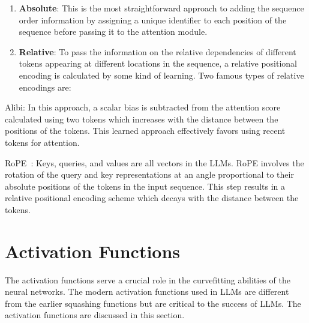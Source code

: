 \documentclass[a4paper,oneside]{book}
\begin{document}
\begin{enumerate}
  \item \textbf{Absolute}: This is the most straightforward approach to adding the sequence order information by assigning a unique identifier to each position of the sequence before passing it to the attention module.

  \item \textbf{Relative}: To pass the information on the relative dependencies of different tokens appearing at different locations in the sequence, a relative positional encoding is calculated by some kind of learning. Two famous types of relative encodings are:
\end{enumerate}

Alibi: In this approach, a scalar bias is subtracted from the attention score calculated using two tokens which increases with the distance between the positions of the tokens. This learned approach effectively favors using recent tokens for attention.

RoPE~\cite{su2024roformer}: Keys, queries, and values are all vectors in the LLMs. RoPE involves the rotation of the query and key representations at an angle proportional to their absolute positions of the tokens in the input sequence. This step results in a relative positional encoding scheme which decays with the distance between the tokens.

\section{Activation Functions}
The activation functions serve a crucial role in the curvefitting abilities of the neural networks. The modern activation functions used in LLMs are different from the earlier squashing functions but are critical to the success of LLMs. The activation functions are discussed in this section.
\end{document}
